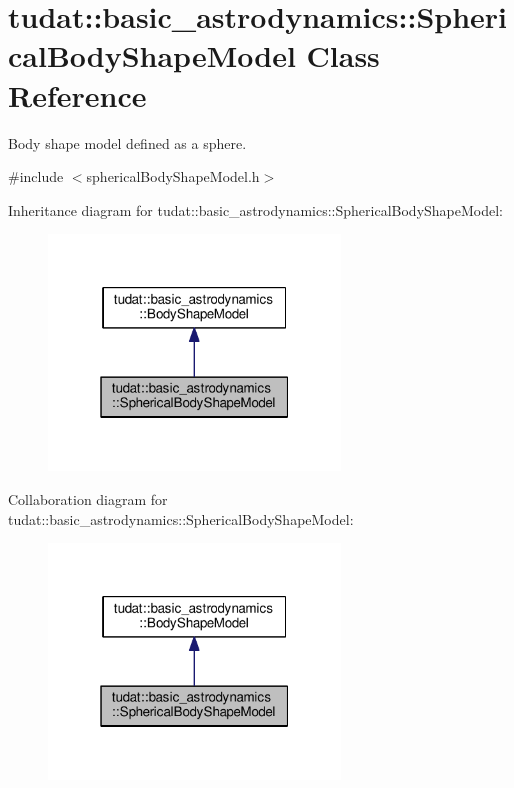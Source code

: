 \hypertarget{classtudat_1_1basic__astrodynamics_1_1SphericalBodyShapeModel}{}\section{tudat\+:\+:basic\+\_\+astrodynamics\+:\+:Spherical\+Body\+Shape\+Model Class Reference}
\label{classtudat_1_1basic__astrodynamics_1_1SphericalBodyShapeModel}


Body shape model defined as a sphere.  




{\ttfamily \#include $<$spherical\+Body\+Shape\+Model.\+h$>$}



Inheritance diagram for tudat\+:\+:basic\+\_\+astrodynamics\+:\+:Spherical\+Body\+Shape\+Model\+:
\nopagebreak
\begin{figure}[H]
\begin{center}
\leavevmode
\includegraphics[width=220pt]{classtudat_1_1basic__astrodynamics_1_1SphericalBodyShapeModel__inherit__graph}
\end{center}
\end{figure}


Collaboration diagram for tudat\+:\+:basic\+\_\+astrodynamics\+:\+:Spherical\+Body\+Shape\+Model\+:
\nopagebreak
\begin{figure}[H]
\begin{center}
\leavevmode
\includegraphics[width=220pt]{classtudat_1_1basic__astrodynamics_1_1SphericalBodyShapeModel__coll__graph}
\end{center}
\end{figure}
